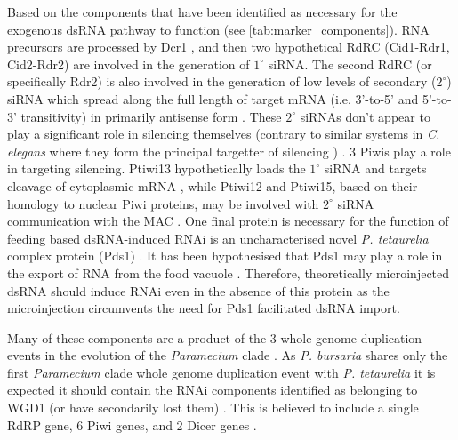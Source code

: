 Based on the components that have been identified as necessary
for the exogenous dsRNA pathway to function (see \cref{tab:marker_components}).  
RNA precursors are processed
by Dcr1 \citep{Lepere2009}, and then two hypothetical RdRC (Cid1-Rdr1, Cid2-Rdr2)
\citep{Marker2010,Marker2014} are involved in the generation of \(1^{\circ}\) 
siRNA.  
The second RdRC (or specifically Rdr2) is also involved in the generation
of low levels of secondary (\(2^{\circ}\)) siRNA which spread along the full length of
target mRNA (i.e. 3'-to-5' and 5'-to-3' transitivity) in primarily
antisense form \citep{Carradec2015}.  These \(2^{\circ}\) siRNAs don't
appear to play a significant role in silencing themselves (contrary to similar
systems in \textit{C. elegans} where they form the principal targetter of silencing 
\citep{Sijen2007,Pak2007}) \citep{Carradec2015}.
3 Piwis play a role in targeting silencing.  Ptiwi13 hypothetically
loads the \(1^{\circ}\) siRNA and targets cleavage of cytoplasmic mRNA \citep{Bouhouche2011},
while Ptiwi12 and Ptiwi15, based on their homology to nuclear Piwi proteins,
\citep{Marker2014,Carradec2015,Bouhouche2011} may be involved
with \(2^{\circ}\) siRNA communication with the MAC \citep{Carradec2015}.
One final protein is necessary for the function of feeding based dsRNA-induced
RNAi is an uncharacterised novel \textit{P. tetaurelia} complex protein (Pds1) \citep{Marker2014}.
It has been hypothesised that Pds1 may play a role in the export of RNA from 
the food vacuole \citep{Carradec2015}.  Therefore, theoretically
microinjected dsRNA should induce RNAi even in the absence of this protein
as the microinjection circumvents the need for Pds1 facilitated dsRNA import.


Many of these components are a product of the 3 whole genome duplication
events in the evolution of the \textit{Paramecium} clade \citep{McGrath2014}.
As \textit{P. bursaria} shares only the first \textit{Paramecium} clade whole
genome duplication event with \textit{P. tetaurelia} it is expected
it should contain the RNAi components identified as belonging to WGD1 (or have 
secondarily lost them) \citep{McGrath2014}.
This is believed to include a single RdRP gene, 6 Piwi genes, and 2 Dicer genes \citep{Marker2014}.



